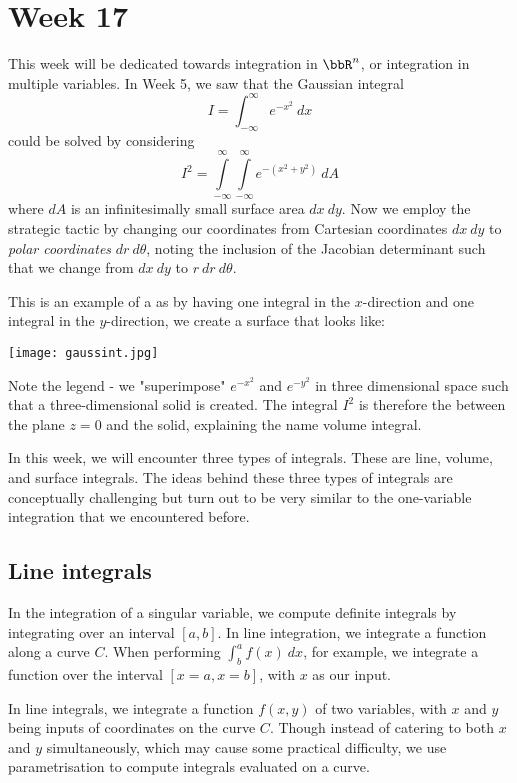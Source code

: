 \documentclass[a4paper, 12pt,oneside,openany]{book}
\begin{document}
\chapter{Week 17}

This week will be dedicated towards integration in $\bbR^n$, or integration in multiple variables. In Week 5, we saw that the Gaussian integral $$I=\int_{-\infty}^\infty e^{-x^2}\ dx$$ could be solved by considering $$I^2 = \int \limits_{-\infty}^\infty \int \limits_{-\infty}^\infty e^{-(x^2+y^2)}\ dA$$ where $dA$ is an infinitesimally small surface area $dx \ dy$. Now we employ the strategic tactic by changing our coordinates from Cartesian coordinates $dx\ dy$ to \emph{polar coordinates} $dr \ d\theta$, noting the inclusion of the Jacobian determinant such that we change from $dx\ dy$ to $r\ dr \ d\theta$.

This is an example of a  as by having one integral in the $x$-direction and one integral in the $y$-direction, we create a surface that looks like: 

\texttt{[image: gaussint.jpg]}

Note the legend - we "superimpose" $e^{-x^2}$ and $e^{-y^2}$ in three dimensional space such that a three-dimensional solid is created. The integral $I^2$ is therefore the  between the plane $z=0$ and the solid, explaining the name volume integral.

In this week, we will encounter three types of integrals. These are line, volume, and surface integrals. The ideas behind these three types of integrals are conceptually challenging but turn out to be very similar to the one-variable integration that we encountered before.

\section{Line integrals}

In the integration of a singular variable, we compute definite integrals by integrating over an interval $[a, b]$. In line integration, we integrate a function along a curve $C$. When performing $\int_b^a f(x) \ dx$, for example, we integrate a function over the interval $[x=a, x=b]$, with $x$ as our input. 

In line integrals, we integrate a function $f(x, y)$ of two variables, with $x$ and $y$ being inputs of coordinates on the curve $C$. Though instead of catering to both $x$ and $y$ simultaneously, which may cause some practical difficulty, we use parametrisation to compute integrals evaluated on a curve. 
\end{document}
